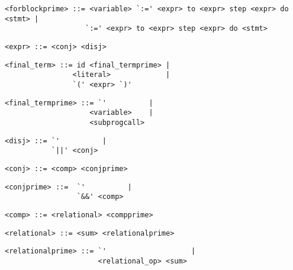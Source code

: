 \begin{footnotesize}
\begin{lstlisting}[frame=single, label={forblockprime}, language=pie]
<forblockprime> ::= <variable> `:=' <expr> to <expr> step <expr> do <stmt> |
                   `:=' <expr> to <expr> step <expr> do <stmt>
\end{lstlisting}

\begin{lstlisting}[frame=single, label={expr}, language=pie]
<expr> ::= <conj> <disj>
\end{lstlisting}

\begin{lstlisting}[frame=single, label={final_term}, language=pie]
<final_term> ::= id <final_termprime> |
                <literal>             |
                `(' <expr> `)'
\end{lstlisting}

\begin{lstlisting}[frame=single, label={final_termprime}, language=pie]
<final_termprime> ::= `'          |
                    <variable>    |
                    <subprogcall>
\end{lstlisting}

\begin{lstlisting}[frame=single, label={disj}, language=pie]
<disj> ::= `'          |
           `||' <conj>
\end{lstlisting}

\begin{lstlisting}[frame=single, label={conj}, language=pie]
<conj> ::= <comp> <conjprime>
\end{lstlisting}

\begin{lstlisting}[frame=single, label={conjprime}, language=pie]
<conjprime> ::=  `'          |
                 `&&' <comp>
\end{lstlisting}

\begin{lstlisting}[frame=single, label={comp}, language=pie]
<comp> ::= <relational> <compprime>
\end{lstlisting}

\begin{lstlisting}[frame=single, label={relational}, language=pie]
<relational> ::= <sum> <relationalprime>
\end{lstlisting}

\begin{lstlisting}[frame=single, label={relationalprime}, language=pie]
<relationalprime> ::= `'                    |
                      <relational_op> <sum>
\end{lstlisting}


\end{footnotesize}

